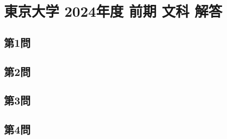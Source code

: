 ﻿\documentclass[../../uem_mat_tok_a.tex]{subfiles}
\begin{document}
    \section{東京大学 2024年度 前期 文科 解答}

    \subsection{第1問}
    

    \clearpage
    \subsection{第2問}
    

    \clearpage
    \subsection{第3問}
    

    \clearpage
    \subsection{第4問}
    

    \clearpage
\end{document}
